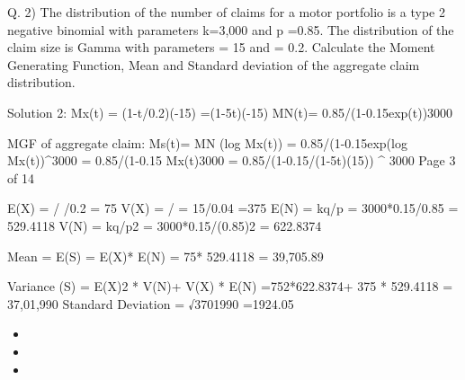 Q. 2)
The distribution of the number of claims for a motor portfolio is a type 2 negative binomial with parameters k=3,000 and p =0.85. The distribution of the claim size is Gamma with parameters \alpha = 15 and \lambda = 0.2.
Calculate the Moment Generating Function, Mean and Standard deviation of the aggregate claim distribution.



Solution 2:
Mx(t) = (1-t/0.2)(-15) =(1-5t)(-15)
MN(t)= {0.85/(1-0.15exp(t))}3000

MGF of aggregate claim:
Ms(t)= MN (log Mx(t))
= {0.85/(1-0.15exp(log Mx(t))}^3000
= {0.85/(1-0.15 Mx(t)}3000
= {0.85/(1-0.15/(1-5t)(15))} ^ 3000
Page 3 of 14

E(X) = \alpha/  /0.2 = 75
V(X) = \alpha/ 
= 15/0.04 =375 
E(N) = kq/p = 3000*0.15/0.85 = 529.4118
V(N) = kq/p2 = 3000*0.15/(0.85)2 = 622.8374

Mean = E(S) = E(X)* E(N) = 75* 529.4118 = 39,705.89

Variance (S) = {E(X)}2 * V(N)+ V(X) * E(N)
=752*622.8374+ 375 * 529.4118 = 37,01,990
Standard Deviation = √3701990 =1924.05 

\begin{itemize}
\item 
\item 
\item 
\end{itemize}

